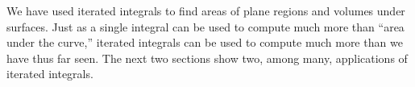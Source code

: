 We have used iterated integrals to find areas of plane regions and volumes under surfaces. Just as a single integral can be used to compute much more than ``area under the curve,'' iterated integrals can be used to compute much more than we have thus far seen. The next two sections show two, among many, applications of iterated integrals.

